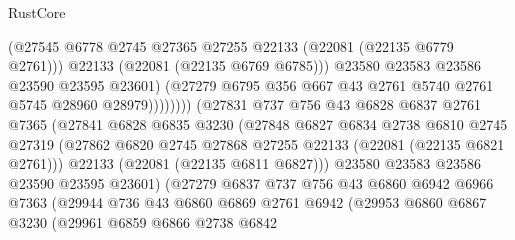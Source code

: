 \begin{lexlean}{RustCore}
\begin{coremodule}
                                  (@27545
                                    @6778
                                    @2745
                                    @27365
                                    @27255
                                    @22133
                                    (@22081 (@22135 @6779 @2761)))
                                  @22133
                                  (@22081 (@22135 @6769 @6785)))
                                @23580
                                @23583
                                @23586
                                @23590
                                @23595
                                @23601)
                              (@27279
                                @6795
                                @356
                                @667
                                @43
                                @2761
                                @5740
                                @2761
                                @5745
                                @28960
                                @28979))))))))
                (@27831
                  @737
                  @756
                  @43
                  @6828
                  @6837
                  @2761
                  @7365
                  (@27841
                    @6828
                    @6835
                    @3230
                    (@27848
                      @6827
                      @6834
                      @2738
                      @6810
                      @2745
                      @27319
                      (@27862 @6820 @2745 @27868 @27255 @22133 (@22081 (@22135 @6821 @2761)))
                      @22133
                      (@22081 (@22135 @6811 @6827)))
                    @23580
                    @23583
                    @23586
                    @23590
                    @23595
                    @23601)
                  (@27279
                    @6837
                    @737
                    @756
                    @43
                    @6860
                    @6942
                    @6966
                    @7363
                    (@29944
                      @736
                      @43
                      @6860
                      @6869
                      @2761
                      @6942
                      (@29953
                        @6860
                        @6867
                        @3230
                        (@29961
                          @6859
                          @6866
                          @2738
                          @6842

\end{coremodule}
\end{lexlean}

